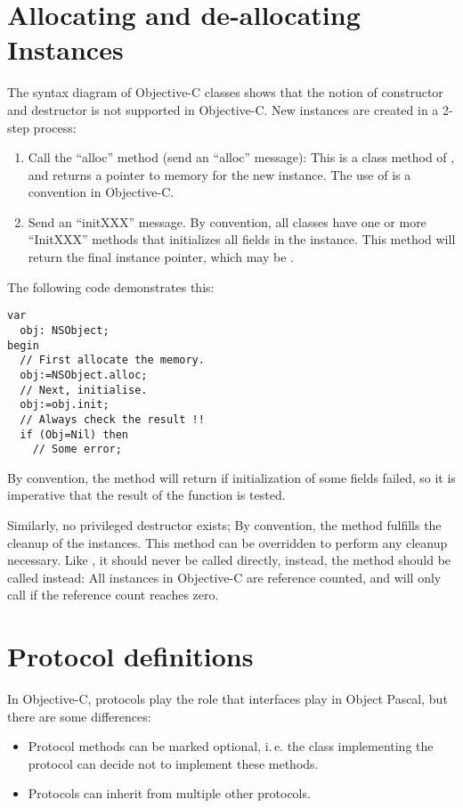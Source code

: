 \section{Allocating and de-allocating Instances}
The syntax diagram of Objective-C classes shows that the notion of
constructor and destructor is not supported in Objective-C. New instances
are created in a 2-step process:
\begin{enumerate}
\item Call the ``alloc'' method (send an ``alloc'' message): This is a class method
of , and returns a pointer to memory for the new instance.
The use of  is a convention in Objective-C.
\item Send an ``initXXX'' message. By convention, all classes have one or more
``InitXXX'' methods that initializes all fields in the instance. This method
will return the final instance pointer, which may be .
\end{enumerate}
The following code demonstrates this:
\begin{verbatim}
var
  obj: NSObject;
begin
  // First allocate the memory.
  obj:=NSObject.alloc;
  // Next, initialise.
  obj:=obj.init;
  // Always check the result !!
  if (Obj=Nil) then
    // Some error;
\end{verbatim}
By convention, the  method will return  if
initialization of some fields failed, so it is imperative that the result of
the function is tested.

Similarly, no privileged destructor exists; By convention, the  method
fulfills the cleanup of the instances. This method can be overridden to
perform any cleanup necessary. Like , it should never be called directly,
instead, the  method should be called instead: All instances in
Objective-C are reference counted, and  will only call
 if the reference count reaches zero.

\section{Protocol definitions}
In Objective-C, protocols play the role that interfaces play in Object
Pascal, but there are some differences:
\begin{itemize}
\item Protocol methods can be marked optional, i.\,e. the class implementing
the protocol can decide not to implement these methods.
\item Protocols can inherit from multiple  other protocols.
\end{itemize}

